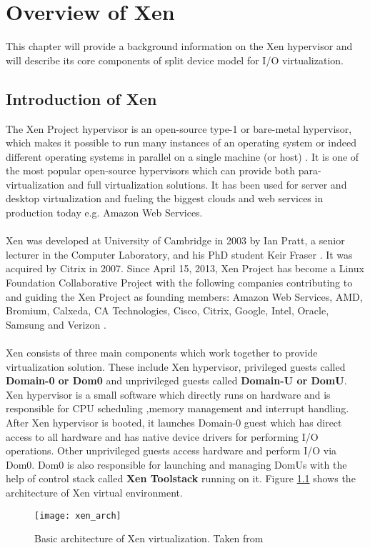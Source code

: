\chapter{Overview of Xen\label{cha:chapter3}}
This chapter will provide a background information on the Xen hypervisor and will describe its core components of split device model for I/O virtualization.

\section{Introduction of Xen\label{sec:xen}}
The Xen Project hypervisor is an open-source type-1 or bare-metal hypervisor, which makes it possible to run many instances of an operating system or indeed different operating systems in parallel on a single machine (or host) \cite{xen}. It is one of the most popular open-source hypervisors which can provide both para-virtualization and full virtualization solutions. It has been used for server and desktop virtualization and fueling the biggest clouds and web services in production today e.g. Amazon Web Services. 
\\
\\
Xen was developed at University of Cambridge in 2003 by Ian Pratt, a senior lecturer in the Computer Laboratory, and his PhD student Keir Fraser \cite{xen_wiki}. It was acquired by Citrix in 2007. Since April 15, 2013, Xen Project has become a Linux Foundation Collaborative Project with the following companies  contributing to and guiding the Xen Project as founding members: Amazon Web Services, AMD, Bromium, Calxeda, CA Technologies, Cisco, Citrix, Google, Intel, Oracle, Samsung and Verizon \cite{xen_news}.
\\
\\
Xen consists of three main components which work together to provide virtualization solution. These include Xen hypervisor, privileged guests called \textbf{Domain-0 or Dom0} and unprivileged guests called \textbf{Domain-U or DomU}. Xen hypervisor is a small software which directly runs on hardware and is responsible for CPU scheduling ,memory management and interrupt handling. After Xen hypervisor is booted, it launches Domain-0 guest which has direct access to all hardware and has native device drivers for performing I/O operations. Other unprivileged guests access hardware and perform I/O via Dom0. Dom0 is also responsible for launching and managing DomUs with the help of control stack called \textbf{Xen Toolstack} running on it. Figure \ref{xen_arch} shows the architecture of Xen virtual environment.
\begin{figure}[!htbp]
	\centering
	\texttt{[image: xen\_arch]}
	\caption{Basic architecture of Xen virtualization. Taken from \cite{xen_wiki}}
	\label{xen_arch}
\end{figure}
\\
\\
